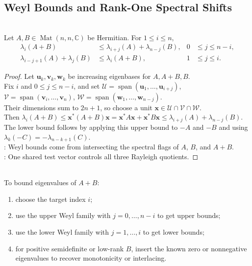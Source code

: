 \subsection{Weyl Bounds and Rank-One Spectral Shifts}

\begin{theorem} \label{thm:weyl-eigenvalue-inequalities-hermitian-sums} \\
Let $A,B\in\operatorname{Mat}(n,n,\mathbb{C})$ be Hermitian. For $1\leq i\leq n$,
\begin{align*}
\lambda_i(A+B) &\leq \lambda_{i+j}(A)+\lambda_{n-j}(B),
& 0 &\leq j\leq n-i,\\
\lambda_{i-j+1}(A)+\lambda_j(B) &\leq \lambda_i(A+B),
& 1 &\leq j\leq i.
\end{align*}
\begin{proof}
Let $\mathbf{u}_k,\mathbf{v}_k,\mathbf{w}_k$ be increasing eigenbases for $A,A+B,B$.\\
Fix $i$ and $0\leq j\leq n-i$, and set $\mathcal{U}=\operatorname{span}(\mathbf{u}_1,\ldots,\mathbf{u}_{i+j})$, $\mathcal{V}=\operatorname{span}(\mathbf{v}_i,\ldots,\mathbf{v}_n)$, $\mathcal{W}=\operatorname{span}(\mathbf{w}_1,\ldots,\mathbf{w}_{n-j})$.\\
Their dimensions sum to $2n+1$, so choose a unit $\mathbf{x}\in\mathcal{U}\cap\mathcal{V}\cap\mathcal{W}$.\\
Then $\lambda_i(A+B)\leq \mathbf{x}^*(A+B)\mathbf{x} =\mathbf{x}^*A\mathbf{x}+\mathbf{x}^*B\mathbf{x} \leq \lambda_{i+j}(A)+\lambda_{n-j}(B)$.\\
The lower bound follows by applying this upper bound to $-A$ and $-B$ and using $\lambda_k(-C)=-\lambda_{n-k+1}(C)$.\\
: Weyl bounds come from intersecting the spectral flags of $A$, $B$, and $A+B$.\\
: One shared test vector controls all three Rayleigh quotients.
\end{proof}
\end{theorem}

\begin{method} \label{meth:weyl-inequality-method} \\
To bound eigenvalues of $A+B$:
\begin{enumerate}[label=(\roman*)]
\setlength{\itemsep}{0pt}
\item choose the target index $i$;
\item use the upper Weyl family with $j=0,\ldots,n-i$ to get upper bounds;
\item use the lower Weyl family with $j=1,\ldots,i$ to get lower bounds;
\item for positive semidefinite or low-rank $B$, insert the known zero or nonnegative eigenvalues to recover monotonicity or interlacing.
\end{enumerate}
\end{method}

